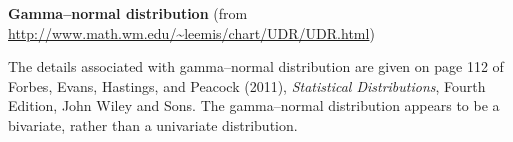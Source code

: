 \documentclass[12pt,fullpage]{article}
\begin{document}
\noindent
{\bf Gamma--normal distribution} (from \color{blue}\url{http://www.math.wm.edu/~leemis/chart/UDR/UDR.html}\color{black})

\noindent
The details associated with gamma--normal distribution are given on page
112 of Forbes, Evans, Hastings, and Peacock (2011), {\it Statistical Distributions},
Fourth Edition, John Wiley and Sons.
The gamma--normal distribution appears to be a bivariate, rather than a univariate
distribution.
\end{document}

